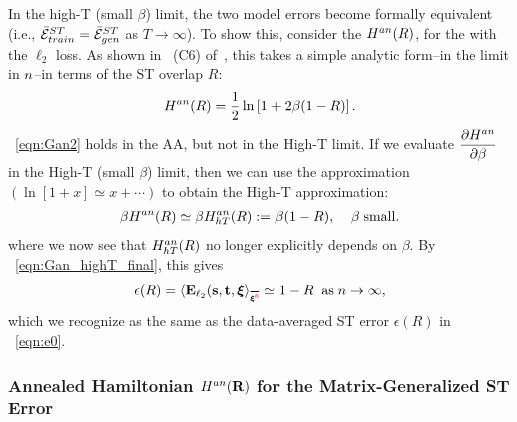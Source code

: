 In the high-T (small $\beta$) limit, the two model errors become formally equivalent
(i.e., $\bar{\mathcal{E}}^{ST}_{train}=\bar{\mathcal{E}}^{ST}_{gen}$ as $T\rightarrow\infty$).
To show this, consider the \AnnealedHamiltonian $H^{an}(R)$, for the \LinearPerceptron with the $\ell_2$ loss. 
As shown in \EQN~(C6) of~\cite{SST92}, this takes a simple analytic form--in the \LargeN limit in $n$--in terms of the ST overlap $R$:
\begin{align}
\label{eqn:Gan2}
H^{an}(R) = \dfrac{1}{2}\ln\left[{1+2\beta(1-R)}\right]  .
\end{align}
\EQN~\ref{eqn:Gan2} holds in the AA, but not in the High-T limit.
If we evaluate $\dfrac{\partial H^{an}}{\partial \beta}$ in the High-T (small $\beta$) limit, 
then we can use the approximation $(\ln[1+x]\simeq x+\cdots)$ to obtain the High-T approximation:
\begin{align}
\label{eqn:Gan3}
\beta H^{an}(R) \simeq 
\beta H^{an}_{hT}(R):=\beta(1-R),\;\;\;\;\beta\;\text{small}  .
\end{align}
where we now see that $H^{an}_{hT}(R)$ no longer explicitly depends on $\beta$.
%
By \EQN~\ref{eqn:Gan_highT_final}, this gives 
\begin{align}
\label{eqn:Gan4}
\EPSL(R) =
\langle  \mathbf{E}_{\ell_2}(\SVEC,\TVEC,\XI \rangle_{\AVGNDXI} \simeq 1-R\;\;\text{as}\;\ND\rightarrow\infty  ,
\end{align}
which we recognize as the same as the data-averaged ST error $\epsilon(R)$ in \EQN~\ref{eqn:e0}.


\subsubsection{Annealed Hamiltonian \texorpdfstring{$H^{an}(\mathbf{R})$}{H(R)} for the Matrix-Generalized ST Error}
\label{sxn:appendix_Gan}

